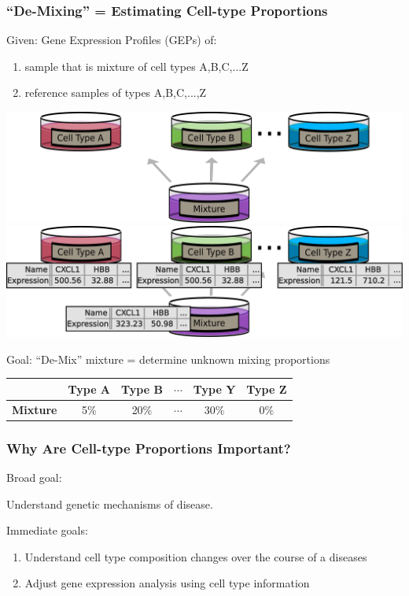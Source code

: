 \documentclass[usenames,dvipsnames,15pt]{beamer}
\begin{document}
\begin{frame}
  \frametitle{``De-Mixing'' = Estimating Cell-type Proportions}
  \alert{\large Given:} Gene Expression Profiles (GEPs) of:
  \begin{enumerate}
  \item sample that is mixture of cell types A,B,C,...Z
  \item reference samples of types A,B,C,...,Z\\
  \end{enumerate}
  \hspace{1cm}\begin{center}
    \begin{overprint}
      \hspace{-.75cm}\includegraphics[scale=.28]{pictures/mixture_cartoon}
      \hspace*{-.77cm}\includegraphics[scale=.28]{pictures/mixture_cartoon_data}
    \end{overprint}
  \end{center}
  \alert{\large Goal:} ``De-Mix'' mixture = determine unknown mixing proportions
  {\scriptsize \begin{center}\begin{tabular}{c||c|c|c|c|c}
      & \bf Type A& \bf Type B& $\cdots$& \bf Type Y&\bf  Type Z\\\hline\hline
    \bf Mixture& 5\%& 20\%& $\cdots$& 30\%& 0\%
  \end{tabular}\end{center}}
\end{frame}

\begin{frame}
  \frametitle{Why Are Cell-type Proportions Important?}
    {\Large\alert{ Broad goal:}\\\begin{center} Understand genetic mechanisms of disease.\end{center}}
    {\Large\alert{ Immediate goals:}}
    \begin{enumerate}
    \item Understand cell type composition changes over the course of a diseases
    \item Adjust gene expression analysis using cell type information
    \end{enumerate}
\end{frame}
\end{document}
